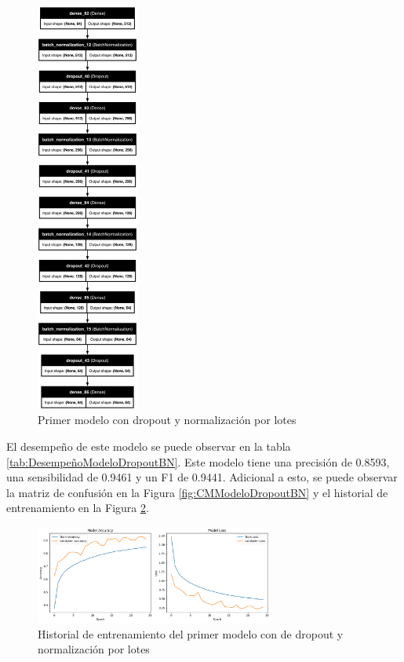 \begin{figure}[H]
    \centering
    \includegraphics[width=0.3\textwidth]{figuras/modelDropoutBN.png}
    \caption{Primer modelo con dropout y normalización por lotes}
    \label{fig:ModeloDropoutBN}
\end{figure}

El desempeño de este modelo se puede observar en la tabla \ref{tab:DesempeñoModeloDropoutBN}.
Este modelo tiene una precisión de 0.8593, una sensibilidad de 0.9461 y un F1 de 0.9441.
Adicional a esto, se puede observar la matriz de confusión en la Figura \ref{fig:CMModeloDropoutBN} y el historial de entrenamiento en la Figura \ref{fig:HistoryModeloDropoutBN}.

\begin{figure}[H]
    \centering
    \includegraphics[width=0.7\textwidth]{figuras/modelDropoutBNHistory.png}
    \caption{Historial de entrenamiento del primer modelo con de dropout y normalización por lotes}
    \label{fig:HistoryModeloDropoutBN}
\end{figure}

